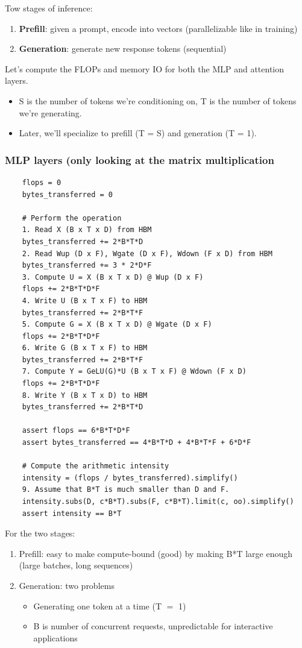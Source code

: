 \documentclass[12pt,twoside]{article}
\begin{document}
Tow stages of inference:
\begin{enumerate}
    \item \textbf{Prefill}: given a prompt, encode into vectors (parallelizable like in training)
    \item \textbf{Generation}: generate new response tokens (sequential)
\end{enumerate}

Let's compute the FLOPs and memory IO for both the MLP and attention layers.

\begin{itemize}
    \item S is the number of tokens we're conditioning on, T is the number of tokens we're generating.
    \item Later, we'll specialize to prefill (T = S) and generation (T = 1).
\end{itemize}

\subsubsection*{MLP layers (only looking at the matrix multiplication}

\begin{verbatim}
    flops = 0
    bytes_transferred = 0
    
    # Perform the operation
    1. Read X (B x T x D) from HBM
    bytes_transferred += 2*B*T*D
    2. Read Wup (D x F), Wgate (D x F), Wdown (F x D) from HBM
    bytes_transferred += 3 * 2*D*F
    3. Compute U = X (B x T x D) @ Wup (D x F)
    flops += 2*B*T*D*F
    4. Write U (B x T x F) to HBM
    bytes_transferred += 2*B*T*F
    5. Compute G = X (B x T x D) @ Wgate (D x F)
    flops += 2*B*T*D*F
    6. Write G (B x T x F) to HBM
    bytes_transferred += 2*B*T*F
    7. Compute Y = GeLU(G)*U (B x T x F) @ Wdown (F x D)
    flops += 2*B*T*D*F
    8. Write Y (B x T x D) to HBM
    bytes_transferred += 2*B*T*D
    
    assert flops == 6*B*T*D*F
    assert bytes_transferred == 4*B*T*D + 4*B*T*F + 6*D*F
    
    # Compute the arithmetic intensity
    intensity = (flops / bytes_transferred).simplify()  
    9. Assume that B*T is much smaller than D and F.
    intensity.subs(D, c*B*T).subs(F, c*B*T).limit(c, oo).simplify()  
    assert intensity == B*T
\end{verbatim}

For the two stages:
\begin{enumerate}
    \item Prefill: easy to make compute-bound (good) by making B*T large enough (large batches, long sequences)
    \item Generation: two problems
    \begin{itemize}
        \item Generating one token at a time (T \(=\) 1)
        \item B is number of concurrent requests, unpredictable for interactive applications
    \end{itemize}
\end{enumerate}
\end{document}
